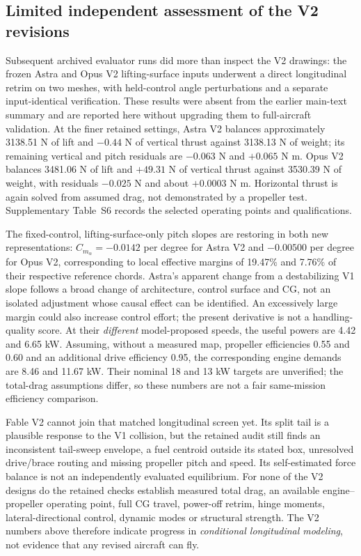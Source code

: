 \documentclass[11pt,a4paper]{article}
\begin{document}
\subsection{Limited independent assessment of the V2 revisions}
Subsequent archived evaluator runs did more than inspect the V2 drawings: the frozen Astra and Opus V2 lifting-surface inputs underwent a direct longitudinal retrim on two meshes, with held-control angle perturbations and a separate input-identical verification. These results were absent from the earlier main-text summary and are reported here without upgrading them to full-aircraft validation. At the finer retained settings, Astra V2 balances approximately 3138.51 N of lift and $-0.44$ N of vertical thrust against 3138.13 N of weight; its remaining vertical and pitch residuals are $-0.063$ N and $+0.065$ N m. Opus V2 balances 3481.06 N of lift and $+49.31$ N of vertical thrust against 3530.39 N of weight, with residuals $-0.025$ N and about $+0.0003$ N m. Horizontal thrust is again solved from assumed drag, not demonstrated by a propeller test. Supplementary Table~S6 records the selected operating points and qualifications.

The fixed-control, lifting-surface-only pitch slopes are restoring in both new representations: $C_{m_\alpha}=-0.0142$ per degree for Astra V2 and $-0.00500$ per degree for Opus V2, corresponding to local effective margins of 19.47\% and 7.76\% of their respective reference chords. Astra's apparent change from a destabilizing V1 slope follows a broad change of architecture, control surface and CG, not an isolated adjustment whose causal effect can be identified. An excessively large margin could also increase control effort; the present derivative is not a handling-quality score. At their \emph{different} model-proposed speeds, the useful powers are 4.42 and 6.65 kW. Assuming, without a measured map, propeller efficiencies 0.55 and 0.60 and an additional drive efficiency 0.95, the corresponding engine demands are 8.46 and 11.67 kW. Their nominal 18 and 13 kW targets are unverified; the total-drag assumptions differ, so these numbers are not a fair same-mission efficiency comparison.

Fable V2 cannot join that matched longitudinal screen yet. Its split tail is a plausible response to the V1 collision, but the retained audit still finds an inconsistent tail-sweep envelope, a fuel centroid outside its stated box, unresolved drive/brace routing and missing propeller pitch and speed. Its self-estimated force balance is not an independently evaluated equilibrium. For none of the V2 designs do the retained checks establish measured total drag, an available engine--propeller operating point, full CG travel, power-off retrim, hinge moments, lateral-directional control, dynamic modes or structural strength. The V2 numbers above therefore indicate progress in \emph{conditional longitudinal modeling}, not evidence that any revised aircraft can fly.
\end{document}
